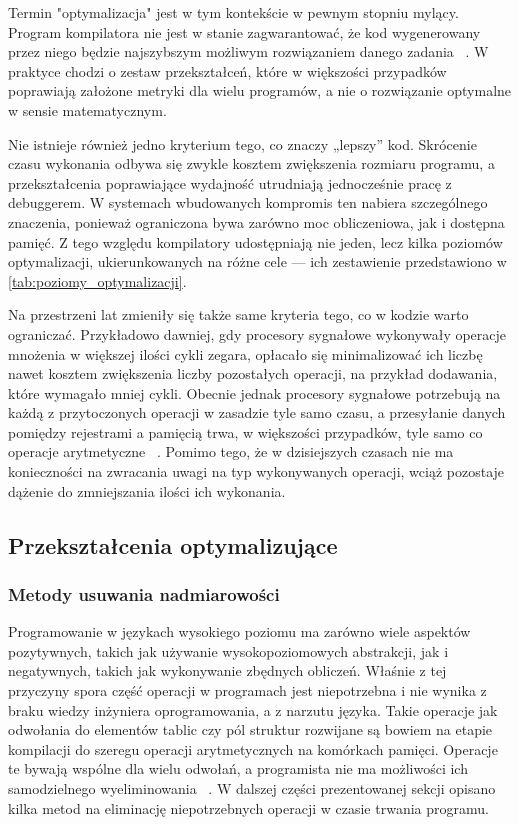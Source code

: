 Termin "optymalizacja" jest w tym kontekście w pewnym stopniu mylący. Program kompilatora nie jest w stanie zagwarantować, że kod wygenerowany przez niego będzie najszybszym możliwym rozwiązaniem danego zadania ~\cite{Kompilatory_Aho}. W praktyce chodzi o zestaw przekształceń, które w większości przypadków poprawiają założone metryki dla wielu programów, a nie o rozwiązanie optymalne w sensie matematycznym.


Nie istnieje również jedno kryterium tego, co znaczy „lepszy” kod. Skrócenie czasu wykonania odbywa się zwykle kosztem zwiększenia rozmiaru programu, a przekształcenia poprawiające wydajność utrudniają jednocześnie pracę z debuggerem. W systemach wbudowanych kompromis ten nabiera szczególnego znaczenia, ponieważ ograniczona bywa zarówno moc obliczeniowa, jak i dostępna pamięć. Z tego względu kompilatory udostępniają nie jeden, lecz kilka poziomów optymalizacji, ukierunkowanych na różne cele — ich zestawienie przedstawiono w \cref{tab:poziomy_optymalizacji}.

Na przestrzeni lat zmieniły się także same kryteria tego, co w kodzie warto ograniczać. Przykładowo dawniej, gdy procesory sygnałowe wykonywały operacje mnożenia w większej ilości cykli zegara, opłacało się minimalizować ich liczbę nawet kosztem zwiększenia liczby pozostałych operacji, na przykład dodawania, które wymagało mniej cykli. Obecnie jednak procesory sygnałowe potrzebują na każdą z przytoczonych operacji w zasadzie tyle samo czasu, a przesyłanie danych pomiędzy rejestrami a pamięcią trwa, w większości przypadków, tyle samo co operacje arytmetyczne ~\cite{ZielinskiDSP}. Pomimo tego, że w dzisiejszych czasach nie ma konieczności na zwracania uwagi na typ wykonywanych operacji, wciąż pozostaje dążenie do zmniejszania ilości ich wykonania.
\subsection{Przekształcenia optymalizujące}

\subsubsection{Metody usuwania nadmiarowości}

Programowanie w językach wysokiego poziomu ma zarówno wiele aspektów pozytywnych, takich jak używanie wysokopoziomowych abstrakcji, jak i negatywnych, takich jak wykonywanie zbędnych obliczeń. Właśnie z tej przyczyny spora część operacji w programach jest niepotrzebna i nie wynika z braku wiedzy inżyniera oprogramowania, a z narzutu języka. Takie operacje jak odwołania do elementów tablic czy pól struktur rozwijane są bowiem na etapie kompilacji do szeregu operacji arytmetycznych na komórkach pamięci. Operacje te bywają wspólne dla wielu odwołań, a programista nie ma możliwości ich samodzielnego wyeliminowania ~\cite{Kompilatory_Aho}. W dalszej części prezentowanej sekcji opisano kilka metod na eliminację niepotrzebnych operacji w czasie trwania programu.

